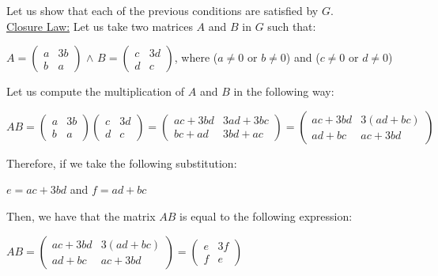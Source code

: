 \documentclass[a4paper,openany,11pt]{book}
\begin{document}
Let us show that each of the previous conditions are satisfied by $G$.\\

\underline{Closure Law:} Let us take two matrices $A$ and $B$ in $G$ such that:

\begin{center}
	$A = \left(\begin{array}{cc}
	a & 3b\\
	b & a
	\end{array}\right)$ \hspace{0.1cm} $\wedge$ \hspace{0.1cm} $B = \left(\begin{array}{cc}
		c & 3d\\
		d & c
	\end{array}\right)$, \hspace{0.1cm} where ($a \neq 0$ or $b \neq 0$) and ($c \neq 0$ or $d \neq 0$)
\end{center}

Let us compute the multiplication of $A$ and $B$ in the following way:

\begin{center}
	$AB = \left(\begin{array}{cc}
	a & 3b\\
	b & a
	\end{array}\right) \left(\begin{array}{cc}
	c & 3d\\
	d & c
	\end{array}\right) = \left(\begin{array}{cc}
	ac + 3bd & 3ad+3bc \\
	bc+ad & 3bd+ac
	\end{array}\right) = \left(\begin{array}{cc}
	ac + 3bd & 3(ad+bc) \\
	ad+bc & ac+3bd
	\end{array}\right)$
\end{center}

Therefore, if we take the following substitution:

\begin{center}
	$e = ac + 3bd$ \hspace{0.1cm} and \hspace{0.1cm} $f = ad+bc$
\end{center}

Then, we have that the matrix $AB$ is equal to the following expression:

\begin{center}
	$AB = \left(\begin{array}{cc}
	ac + 3bd & 3(ad+bc) \\
	ad+bc & ac+3bd
	\end{array}\right) = \left(\begin{array}{cc}
	e & 3f \\
	f & e
	\end{array}\right)$
\end{center}
\end{document}
